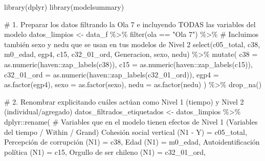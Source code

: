 \documentclass[
  spanish,
  a4paper,
  oneside]{scrbook}
\newenvironment{Shaded}{\begin{snugshade}}{\end{snugshade}}
\newcommand{\AttributeTok}[1]{\textcolor[rgb]{0.40,0.45,0.13}{#1}}
\newcommand{\CommentTok}[1]{\textcolor[rgb]{0.37,0.37,0.37}{#1}}
\newcommand{\FunctionTok}[1]{\textcolor[rgb]{0.28,0.35,0.67}{#1}}
\newcommand{\NormalTok}[1]{\textcolor[rgb]{0.00,0.23,0.31}{#1}}
\newcommand{\OtherTok}[1]{\textcolor[rgb]{0.00,0.23,0.31}{#1}}
\newcommand{\SpecialCharTok}[1]{\textcolor[rgb]{0.37,0.37,0.37}{#1}}
\newcommand{\StringTok}[1]{\textcolor[rgb]{0.13,0.47,0.30}{#1}}
\begin{document}
\begin{Shaded}
\begin{Highlighting}[]
\FunctionTok{library}\NormalTok{(dplyr)}
\FunctionTok{library}\NormalTok{(modelsummary)}

\CommentTok{\# 1. Preparar los datos filtrando la Ola 7 e incluyendo TODAS las variables del modelo}
\NormalTok{datos\_limpios }\OtherTok{\textless{}{-}}\NormalTok{ data\_f }\SpecialCharTok{\%\textgreater{}\%} 
  \FunctionTok{filter}\NormalTok{(ola }\SpecialCharTok{==} \StringTok{"Ola 7"}\NormalTok{) }\SpecialCharTok{\%\textgreater{}\%} 
  \CommentTok{\# Incluimos también sexo y nedu que se usan en tus modelos de Nivel 2}
  \FunctionTok{select}\NormalTok{(c05\_total, c38, m0\_edad, egp4, c15, c32\_01\_ord, Generacion, sexo, nedu) }\SpecialCharTok{\%\textgreater{}\%} 
  \FunctionTok{mutate}\NormalTok{(}
    \AttributeTok{c38        =} \FunctionTok{as.numeric}\NormalTok{(haven}\SpecialCharTok{::}\FunctionTok{zap\_labels}\NormalTok{(c38)),}
    \AttributeTok{c15        =} \FunctionTok{as.numeric}\NormalTok{(haven}\SpecialCharTok{::}\FunctionTok{zap\_labels}\NormalTok{(c15)),}
    \AttributeTok{c32\_01\_ord =} \FunctionTok{as.numeric}\NormalTok{(haven}\SpecialCharTok{::}\FunctionTok{zap\_labels}\NormalTok{(c32\_01\_ord)),}
    \AttributeTok{egp4       =} \FunctionTok{as.factor}\NormalTok{(egp4),}
    \AttributeTok{sexo       =} \FunctionTok{as.factor}\NormalTok{(sexo),}
    \AttributeTok{nedu       =} \FunctionTok{as.factor}\NormalTok{(nedu)}
\NormalTok{  ) }\SpecialCharTok{\%\textgreater{}\%} 
  \FunctionTok{drop\_na}\NormalTok{()}

\CommentTok{\# 2. Renombrar explicitando cuáles actúan como Nivel 1 (tiempo) y Nivel 2 (individual/agregado)}
\NormalTok{datos\_filtrados\_etiquetados }\OtherTok{\textless{}{-}}\NormalTok{ datos\_limpios }\SpecialCharTok{\%\textgreater{}\%} 
\NormalTok{  dplyr}\SpecialCharTok{::}\FunctionTok{rename}\NormalTok{(}
    \CommentTok{\# Variables que en el modelo tienen efectos de Nivel 1 (Variables del tiempo / Within / Grand)}
    \StringTok{\textasciigrave{}}\AttributeTok{Cohesión social vertical (N1 {-} Y)}\StringTok{\textasciigrave{}} \OtherTok{=}\NormalTok{ c05\_total,}
    \StringTok{\textasciigrave{}}\AttributeTok{Percepción de corrupción (N1)}\StringTok{\textasciigrave{}}    \OtherTok{=}\NormalTok{ c38,}
    \StringTok{\textasciigrave{}}\AttributeTok{Edad (N1)}\StringTok{\textasciigrave{}}                        \OtherTok{=}\NormalTok{ m0\_edad,}
    \StringTok{\textasciigrave{}}\AttributeTok{Autoidentificación política (N1)}\StringTok{\textasciigrave{}}  \OtherTok{=}\NormalTok{ c15,}
    \StringTok{\textasciigrave{}}\AttributeTok{Orgullo de ser chileno (N1)}\StringTok{\textasciigrave{}}      \OtherTok{=}\NormalTok{ c32\_01\_ord,}
    

\end{Highlighting}
\end{Shaded}
\end{document}
